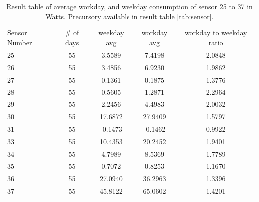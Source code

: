 \begin{table}[h]
	\centering
	\begin{tabular}{l|c|c|c|c}
		Sensor Number & \# of days & weekday avg & workday avg & workday to weekday ratio \\
		25 & 55 & 3.5589 & 7.4198 & 2.0848 \\
		26 & 55 & 3.4856 & 6.9230 & 1.9862 \\
		27 & 55 & 0.1361 & 0.1875 & 1.3776 \\
		28 & 55 & 0.5605 & 1.2871 & 2.2964 \\
		29 & 55 & 2.2456 & 4.4983 & 2.0032 \\
		30 & 55 & 17.6872 & 27.9409 & 1.5797 \\
		31 & 55 & -0.1473 & -0.1462 & 0.9922 \\
		33 & 55 & 10.4353 & 20.2452 & 1.9401 \\
		34 & 55 & 4.7989 & 8.5369 & 1.7789 \\
		35 & 55 & 0.7072 & 0.8253 & 1.1670 \\
		36 & 55 & 27.0940 & 36.2963 & 1.3396 \\
		37 & 55 & 45.8122 & 65.0602 & 1.4201 \\
	\end{tabular}
	\caption{Result table of average \gls{workday}, and weekday consumption of sensor 25 to 37 in Watts. Precursory available in result table \ref{tab:sensor}.}
	\label{tab:sensor_cont}
\end{table}
